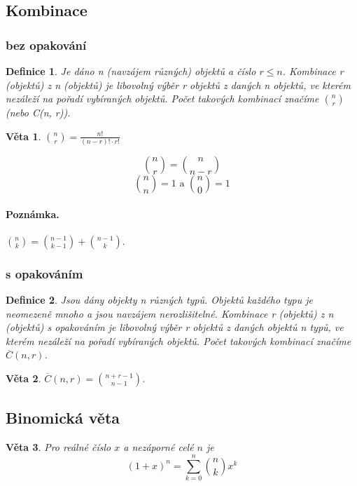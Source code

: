 \documentclass[12pt,a4paper]{article}
\newtheorem{definition}{Definice}
\newtheorem{sentence}{Věta}
\begin{document}
\subsection{Kombinace}
\subsubsection{bez opakování}
\begin{definition}
	Je dáno n (navzájem různých) objektů a číslo $r \leq n$. Kombinace r (objektů) z n (objektů) je libovolný výběr r objektů z daných n objektů, ve kterém nezáleží na pořadí vybíraných objektů. Počet takových kombinací značíme $n \choose r$ (nebo C(n, r)).
\end{definition}
\begin{sentence}
	${n \choose r} = \frac{n!}{(n - r)! \cdot r!}$
\end{sentence}
$$ {n \choose r} = {n \choose n - r} $$
$${n \choose n} = 1 \text{ a } {n \choose 0} = 1 $$
\paragraph{Poznámka.} ${n \choose k} = {n - 1 \choose k - 1} + {n - 1 \choose k}$.

\subsubsection{s opakováním}
\begin{definition}
	Jsou dány objekty n různých typů. Objektů každého typu je neomezeně mnoho a jsou navzájem nerozlišitelné. Kombinace r (objektů) z n (objektů) s opakováním je libovolný výběr r objektů z daných objektů n typů, ve kterém nezáleží na pořadí vybíraných objektů. Počet takových kombinací značíme $\overline{C}(n, r)$.
\end{definition}
\begin{sentence}
	$\overline{C}(n, r) = {n + r - 1 \choose n - 1}$.
\end{sentence}

\subsection{Binomická věta}
\begin{sentence}
Pro reálné číslo $x$ a nezáporné celé $n$ je $$(1 + x)^n = \sum\limits_{k=0}^n {n \choose k} x^k $$
\end{sentence}
\end{document}
